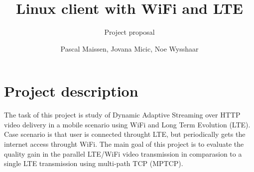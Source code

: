 \documentclass{llncs}
\begin{document}
\title{Linux client with WiFi and LTE}


\subtitle{Project proposal}


\author{Pascal Maissen, Jovana Micic, Noe Wysshaar} 








\maketitle


\section{Project description}
The task of this project is study of Dynamic Adaptive Streaming over HTTP video delivery in a mobile scenario using WiFi and Long Term Evolution (LTE). Case scenario is that user is connected throught LTE, but periodically gets the internet access throught WiFi. The main goal of this project is to evaluate the quality gain in the parallel LTE/WiFi video transmission in comparasion to a single LTE transmission using multi-path TCP (MPTCP). 
\end{document}
